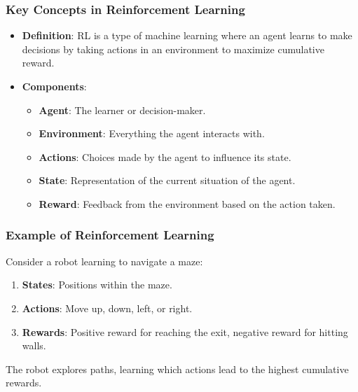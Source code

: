 \documentclass[aspectratio=169]{beamer}
\begin{document}
\begin{frame}[fragile]
  \frametitle{Key Concepts in Reinforcement Learning}
  \begin{itemize}
    \item \textbf{Definition}: RL is a type of machine learning where an agent learns to make decisions by taking actions in an environment to maximize cumulative reward.
    \item \textbf{Components}:
      \begin{itemize}
        \item \textbf{Agent}: The learner or decision-maker.
        \item \textbf{Environment}: Everything the agent interacts with.
        \item \textbf{Actions}: Choices made by the agent to influence its state.
        \item \textbf{State}: Representation of the current situation of the agent.
        \item \textbf{Reward}: Feedback from the environment based on the action taken.
      \end{itemize}
  \end{itemize}
\end{frame}

\begin{frame}[fragile]
  \frametitle{Example of Reinforcement Learning}
  Consider a robot learning to navigate a maze:
  \begin{enumerate}
    \item \textbf{States}: Positions within the maze.
    \item \textbf{Actions}: Move up, down, left, or right.
    \item \textbf{Rewards}: Positive reward for reaching the exit, negative reward for hitting walls.
  \end{enumerate}
  
  The robot explores paths, learning which actions lead to the highest cumulative rewards.
\end{frame}
\end{document}

